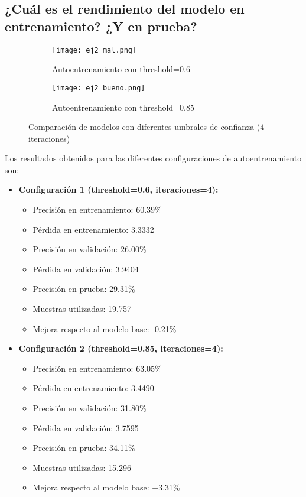 \documentclass{article}
\begin{document}
\subsection{¿Cuál es el rendimiento del modelo en entrenamiento? ¿Y en prueba?}
\begin{figure}[h!]
\centering
\begin{subfigure}{.48\textwidth}
    \centering
    \texttt{[image: ej2\_mal.png]}
    \caption{Autoentrenamiento con threshold=0.6}
    \label{fig:low-threshold}
\end{subfigure}%
\hfill
\begin{subfigure}{.48\textwidth}
    \centering
    \texttt{[image: ej2\_bueno.png]}
    \caption{Autoentrenamiento con threshold=0.85}
    \label{fig:high-threshold}
\end{subfigure}
\caption{Comparación de modelos con diferentes umbrales de confianza (4 iteraciones)}
\label{fig:both-thresholds}
\end{figure}

Los resultados obtenidos para las diferentes configuraciones de autoentrenamiento son:

\begin{itemize}
    \item \textbf{Configuración 1 (threshold=0.6, iteraciones=4):}
    \begin{itemize}
        \item Precisión en entrenamiento: 60.39\%
        \item Pérdida en entrenamiento: 3.3332
        \item Precisión en validación: 26.00\%
        \item Pérdida en validación: 3.9404
        \item Precisión en prueba: 29.31\%
        \item Muestras utilizadas: 19.757
        \item Mejora respecto al modelo base: -0.21\%
    \end{itemize}
    
    \item \textbf{Configuración 2 (threshold=0.85, iteraciones=4):}
    \begin{itemize}
        \item Precisión en entrenamiento: 63.05\%
        \item Pérdida en entrenamiento: 3.4490
        \item Precisión en validación: 31.80\%
        \item Pérdida en validación: 3.7595
        \item Precisión en prueba: 34.11\%
        \item Muestras utilizadas: 15.296
        \item Mejora respecto al modelo base: +3.31\%
    \end{itemize}
\end{itemize}
\end{document}

